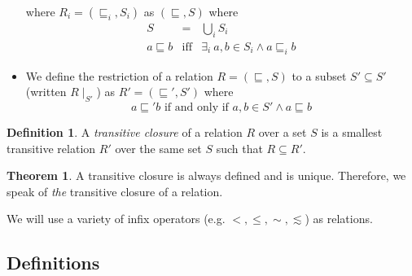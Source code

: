\documentclass[12pt]{article}
\theoremstyle{definition}
\newtheorem{definition}{Definition}[section]
\theoremstyle{theorem}
\newtheorem{theorem}{Theorem}[section]
\begin{document}
\begin{itemize}
    \) where \( R_i = (\sqsubseteq_i, S_i) \) as \( (\sqsubseteq,S) \)
    where
    \begin{eqnarray*}
      S &=& \bigcup_i S_i \\
      a \sqsubseteq b &\textrm{iff}& \exists_i\: a,b \in S_i \wedge a
      \sqsubseteq_i b
    \end{eqnarray*}
    \item We define the restriction of a relation
      \(R=(\sqsubseteq,S)\) to a subset $S'\subseteq S'$ (written
      $R\mid_{S'}$) as \(R' =
      (\sqsubseteq',S')\) where
      \[
      a \sqsubseteq' b \textrm{ if and only if } a,b \in S' \wedge a
      \sqsubseteq b
      \]
\end{itemize}

\begin{definition}
    A \emph{transitive closure} of a relation $R$ over a set $S$ is a
    smallest transitive relation $R'$ over the same set $S$ such that
    $R \subseteq R'$.
\end{definition}
\begin{theorem}
  A transitive closure is always defined and is unique.  Therefore, we
  speak of \emph{the} transitive closure of a relation.
\end{theorem}

We will use a variety of infix operators (e.g. \( <, \leq, \sim, \lesssim \)) as relations. 

\subsection{Definitions}

\def\SimHat#1{\stackrel{\sim}{#1}}
\def\NotSimHat#1{\stackrel{\not\sim}{#1}}
\end{document}
